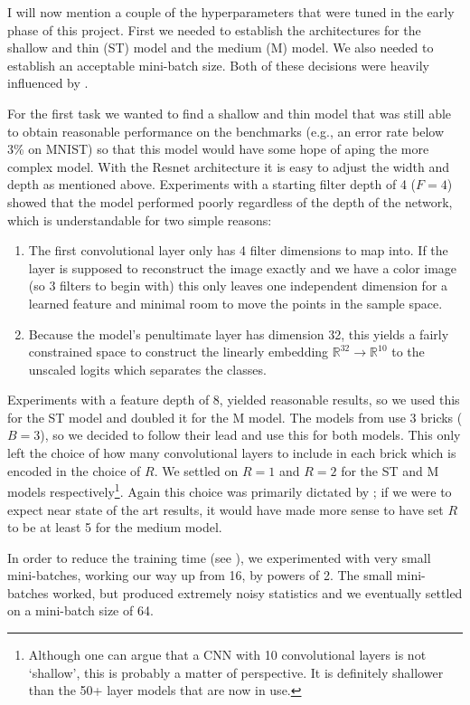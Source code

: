 \documentclass[english,a4paper,oneside]{amsart}
\theoremstyle{definition}
\begin{document}
I will now mention a couple of the hyperparameters that were tuned in the early phase of this project. First we needed to establish the architectures for the shallow and thin (ST) model and the medium (M) model. We also needed to establish an acceptable mini-batch size. Both of these decisions were heavily influenced by .

For the first task we wanted to find a shallow and thin model that was still able to obtain reasonable performance on the benchmarks (e.g., an error rate below 3\% on MNIST) so that this model would have some hope of aping the more complex model. With the Resnet architecture it is easy to adjust the width and depth as mentioned above. Experiments with a starting filter depth of 4 ($F=4$) showed that the model performed poorly regardless of the depth of the network, which is understandable for two simple reasons:
\begin{enumerate}
	\item The first convolutional layer only has 4 filter dimensions to map into. If the layer is supposed to reconstruct the image exactly and we have a color image (so 3 filters to begin with) this only leaves one independent dimension for a learned feature and minimal room to move the points in the sample space. 
	\item Because the model's penultimate layer has dimension 32, this yields a fairly constrained space to construct the linearly embedding $\mathbb{R}^{32}\to \mathbb{R}^{10}$ to the unscaled logits which separates the classes. 
\end{enumerate}
Experiments with a feature depth of 8, yielded reasonable results, so we used this for the ST model and doubled it for the M model. The models from \cite{ResNet} use 3 bricks ($B=3$), so we decided to follow their lead and use this for both models. This only left the choice of how many convolutional layers to include in each brick which is encoded in the choice of $R$. We settled on $R=1$ and $R=2$ for the ST and M models respectively\footnote{Although one can argue that a CNN with 10 convolutional layers is not `shallow', this is probably a matter of perspective. It is definitely shallower than the 50+ layer models that are now in use.}. Again this choice was primarily dictated by ; if we were to expect near state of the art results, it would have made more sense to have set $R$ to be at least 5 for the medium model. 

In order to reduce the training time (see ), we experimented with very small mini-batches, working our way up from 16, by powers of 2. The small mini-batches worked, but produced extremely noisy statistics and we eventually settled on a mini-batch size of 64. 
\end{document}
